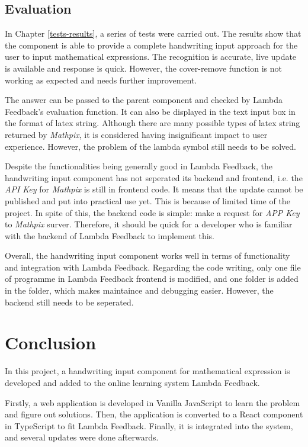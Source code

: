 \documentclass[12pt,twoside]{report}
\begin{document}
\section{Evaluation}
In Chapter \ref{tests-results}, a series of tests were carried out. The results
show that the component is able to provide a complete handwriting input approach
for the user to input mathematical expressions. The recognition is accurate,
live update is available and response is quick. However, the cover-remove function is not working as expected and needs further improvement.

The answer can be passed to the
parent component and checked by Lambda Feedback's evaluation function. It can also
be displayed in the text input box in the format of latex string. Although there are many possible types of latex string returned by \textit{Mathpix}, it is considered having insignificant impact to user experience. However, the problem of the lambda symbol still needs to be solved.

Despite the functionalities being generally good in Lambda Feedback, the
handwriting input component has not seperated its backend and frontend, i.e. the
\textit{API Key} for \textit{Mathpix} is still in frontend code. It means that
the update cannot be published and put into practical use yet. This is because
of limited time of the project. In spite of this, the backend code is simple:
make a request for \textit{APP Key} to \textit{Mathpix} surver. Therefore, it
should be quick for a developer who is familiar with the backend of Lambda
Feedback to implement this.

Overall, the handwriting input component works well in terms of functionality
and integration with Lambda Feedback. Regarding the code writing, only one file
of programme in Lambda Feedback frontend is modified, and one folder is added in
the  folder, which makes maintaince and debugging easier.
However, the backend still needs to be seperated.


\chapter{Conclusion}
\label{Conclusion}
In this project, a handwriting input component for mathematical expression is developed and added to the online learning system Lambda Feedback.

Firstly, a web application is developed in Vanilla JavaScript to learn the
problem and figure out solutions. Then, the application is converted to a React
component in TypeScript to fit Lambda Feedback. Finally, it is integrated into
the system, and several updates were done afterwards.
\end{document}
